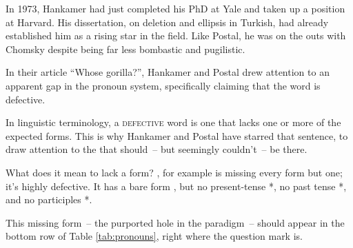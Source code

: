 In 1973, Hankamer had just completed his PhD at Yale and taken up a position at Harvard. His dissertation, on deletion and ellipsis in Turkish, had already established him as a rising star in the field. Like Postal, he was on the outs with Chomsky despite being far less bombastic and pugilistic.

In their article \enquote{Whose gorilla?}, Hankamer and Postal drew attention to an apparent gap in the pronoun system, specifically claiming that the word  is defective.

In linguistic terminology, a \textsc{defective} word is one that lacks one or more of the expected forms. This is why Hankamer and Postal have starred that sentence, to draw attention to the  that should~-- but seemingly couldn't~-- be there.

What does it mean to lack a form? , for example is missing every form but one; it's highly defective. It has a bare form , but no present-tense *, no past tense *, and no participles *.

This missing form~-- the purported hole in the  paradigm~-- should appear in the bottom row of Table \ref{tab:pronouns}, right where the question mark is.

